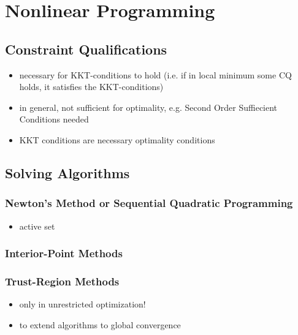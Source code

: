 \documentclass{article}
\begin{document}
\section{Nonlinear Programming}
\subsection{Constraint Qualifications}
\begin{itemize}
\item necessary for KKT-conditions to hold (i.e. if in local minimum some CQ holds, it satisfies the KKT-conditions)
\item in general, not sufficient for optimality, e.g. Second Order Suffiecient Conditions needed
\item KKT conditions are necessary optimality conditions
\end{itemize}

\subsection{Solving Algorithms}
\subsubsection{Newton's Method or Sequential Quadratic Programming}
\begin{itemize}
\item active set
\end{itemize}
\subsubsection{Interior-Point Methods}

\subsubsection{Trust-Region Methods}
\begin{itemize}
\item only in unrestricted optimization!
\item to extend algorithms to global convergence
\end{itemize}

{}

\end{document}

